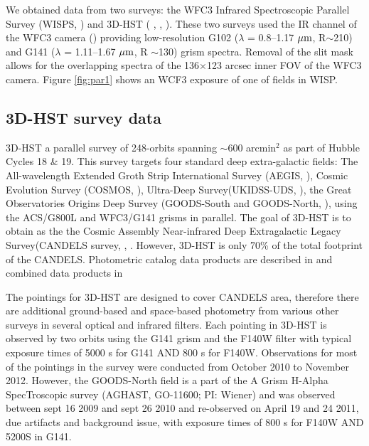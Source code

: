 \documentclass[manuscript]{aastex63}
\begin{document}
We obtained data from two surveys: the WFC3 Infrared Spectroscopic Parallel Survey (WISPS, \citealt{2010ApJ...723..104A}) and 3D-HST ( \citealt{Momcheva2016}, \citealt{2012ApJS..200...13B}, \citealt{Skelton2014}). These two surveys used the IR channel of the WFC3 camera (\citealt{doi:10.1117/12.789581}) providing low-resolution G102 ($\lambda$ = 0.8--1.17 $\mbox{$\mu$m}$, R$\sim$210) and G141 ($\lambda$ = 1.11--1.67 $\mbox{$\mu$m}$, R $\sim$130) grism spectra. Removal of the slit mask allows for the overlapping spectra of the 136$\times$123 arcsec inner FOV of the WFC3 camera. Figure \ref{fig:par1} shows an WCF3 exposure of one of fields in WISP.


\subsection{3D-HST survey data}

 3D-HST a parallel survey of 248-orbits spanning $\sim$600 arcmin$^2$ as part of Hubble Cycles 18 \& 19. This survey targets four standard deep extra-galactic fields: The All-wavelength Extended Groth Strip International Survey (AEGIS, \citealt{1538-4357-660-1-L1} ), Cosmic Evolution Survey (COSMOS, \citealt{Scoville2007}), Ultra-Deep Survey(UKIDSS-UDS, \citealt{2007MNRAS.379.1599L}), the Great Observatories Origins Deep Survey (GOODS-South and GOODS-North, \citealt{Giavalisco2004}), using the ACS/G800L and WFC3/G141 grisms in parallel. The goal of 3D-HST is to obtain as the the Cosmic Assembly Near-infrared Deep Extragalactic Legacy Survey(CANDELS survey, \citealt{2011ApJS..197...35G}, \citealt{2011ApJS..197...36K}. However, 3D-HST is only 70\% of the total footprint of the CANDELS. Photometric catalog data products are described in \cite{Skelton2014} and combined data products in \cite{Momcheva2016}

 The pointings for 3D-HST are designed to cover CANDELS area, therefore there are additional ground-based and space-based photometry from various other surveys in several optical and infrared filters. Each pointing in 3D-HST is observed by two orbits using the G141 grism and the F140W filter with typical exposure times of 5000 s for G141 AND 800 s for F140W. Observations for most of the pointings in the survey were conducted from October 2010 to November 2012. However, the GOODS-North field is a part of the A Grism H-Alpha SpecTroscopic survey (AGHAST, GO-11600; PI: Wiener) and was observed between sept 16 2009 and sept 26 2010 and re-observed on April 19 and 24 2011, due artifacts and background issue, with exposure times of 800 s for F140W AND 5200S in G141.  
\end{document}
